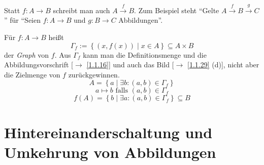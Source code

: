 \documentclass[../../main.tex]{subfiles}
\begin{document}
\begin{nt}[Diagramme]\label{1.1.32}
Statt $f:A\rightarrow B$ schreibt man auch $A\overset f\rightarrow B$. Zum Beispiel steht "`Gelte $A\overset f\rightarrow B\overset g\rightarrow C$"' für "`Seien $f:A\rightarrow B$ und $g:B\rightarrow C$ Abbildungen"'.
\end{nt}

\begin{df}\label{1.1.33}
Für $f:A\rightarrow B$ heißt \[\Gamma_f:=\left\{(x,f(x))\mid x\in A\right\}\subseteq A\times B\] der \emph{Graph} von $f$. Aus $\Gamma_f$ kann man die Definitionsmenge und die Abbildungsvorschrift [$\rightarrow$ \ref{1.1.16}] und auch das Bild [$\rightarrow$ \ref{1.1.29} (d)], nicht aber die Zielmenge von $f$ zurückgewinnen.
$$A=\left\{a\mid \exists b:(a,b)\in\Gamma_f\right\}$$
$$a\mapsto b \text{ falls }(a,b)\in\Gamma_f$$
$$f(A)=\left\{b\mid \exists a:(a,b)\in\Gamma_f\right\}\subseteq B$$
\end{df}

\section{Hintereinanderschaltung und Umkehrung von Abbildungen}
\end{document}
